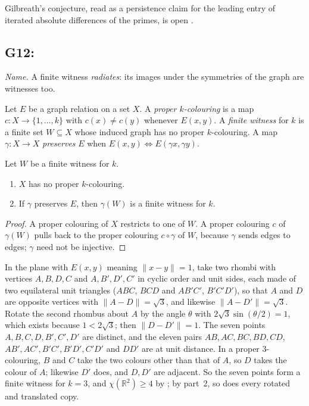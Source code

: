 Gilbreath's conjecture, read as a persistence claim for the leading entry of iterated absolute
differences of the primes, is open \citep{Odlyzko1993}.

\subsection{G12: \lawGTwelve}\label{sec:G12}

\emph{Name.} A finite witness \emph{radiates}: its images under the symmetries of the graph are
witnesses too.

Let $E$ be a graph relation on a set $X$. A \emph{proper $k$-colouring} is a map $c : X \to \{1,
\ldots, k\}$ with $c(x) \ne c(y)$ whenever $E(x, y)$. A \emph{finite witness} for $k$ is a finite set
$W \subseteq X$ whose induced graph has no proper $k$-colouring. A map $\gamma : X \to X$
\emph{preserves} $E$ when $E(x, y) \Leftrightarrow E(\gamma x, \gamma y)$.

\begin{theorem}\label{thm:G12}
Let $W$ be a finite witness for $k$.
\begin{enumerate}
  \item $X$ has no proper $k$-colouring.
  \item If $\gamma$ preserves $E$, then $\gamma(W)$ is a finite witness for $k$.
\end{enumerate}
\end{theorem}

\begin{proof}
A proper colouring of $X$ restricts to one of $W$. A proper colouring $c$ of $\gamma(W)$ pulls back
to the proper colouring $c \circ \gamma$ of $W$, because $\gamma$ sends edges to edges; $\gamma$
need not be injective.
\end{proof}

\begin{example}\label{ex:G12-moser}
In the plane with $E(x, y)$ meaning $\lVert x - y \rVert = 1$, take two rhombi with vertices $A, B, D, C$ and
$A, B', D', C'$ in cyclic order and unit sides, each made of two equilateral unit triangles ($ABC$,
$BCD$ and $AB'C'$, $B'C'D'$), so that $A$ and $D$ are opposite vertices with
$\lVert A - D \rVert = \sqrt 3$, and likewise $\lVert A - D' \rVert = \sqrt 3$. Rotate the second
rhombus about $A$ by the angle $\theta$ with $2\sqrt 3 \sin(\theta/2) = 1$, which exists because
$1 < 2\sqrt 3$; then $\lVert D - D' \rVert = 1$. The seven points $A, B, C, D, B', C', D'$ are
distinct, and the eleven pairs $AB, AC, BC, BD, CD$, $AB', AC', B'C', B'D', C'D'$ and $DD'$ are at
unit distance. In a proper
$3$-colouring, $B$ and $C$ take the two colours other than that of $A$, so $D$ takes the colour of
$A$; likewise $D'$ does, and $D, D'$ are adjacent. So the seven points form a finite witness for
$k = 3$, and $\chi(\mathbb{R}^2) \ge 4$ by ; by part~2, so does every rotated and
translated copy.
\end{example}


